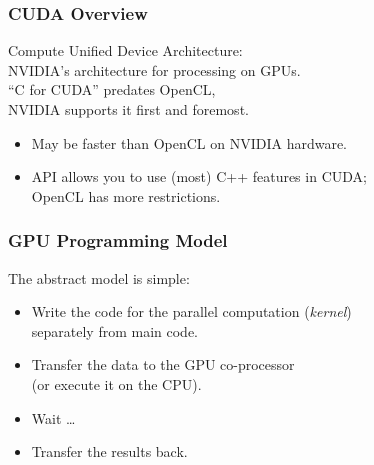 \begin{frame}
  \frametitle{CUDA Overview}
  

     Compute Unified Device Architecture:\\
     NVIDIA's architecture for processing on GPUs.\\[1em]

     ``C for CUDA'' predates OpenCL,\\
     NVIDIA supports it first and foremost.
      \begin{itemize}
        \item May be faster than OpenCL on NVIDIA hardware.
        \item API allows you to use (most) C++ features in CUDA; \\
          OpenCL has more restrictions.
      \end{itemize}

\end{frame}

\begin{frame}
  \frametitle{GPU Programming Model}



  The abstract model is simple:

  \begin{itemize}
    \item Write the code for the parallel computation ({\it kernel}) \\
      \qquad separately from main code.
    \item Transfer the data to the GPU co-processor \\
      \qquad (or execute it on the CPU).
    \item Wait \ldots
    \item Transfer the results back.
  \end{itemize}

\end{frame}

